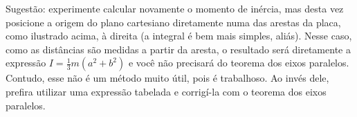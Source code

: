 \begin{question}
\begin{solution}
      Sugestão: experimente calcular novamente o momento de inércia, mas desta vez posicione a origem do plano cartesiano diretamente numa das arestas da placa, como ilustrado acima, à direita (a integral é bem mais simples, aliás).
      Nesse caso, como as distâncias são medidas a partir da aresta, o resultado será diretamente a expressão $I = \frac{1}{3} m (a^2 + b^2)$ e você não precisará do teorema dos eixos paralelos.
      Contudo, esse não é um método muito útil, pois é trabalhoso.
      Ao invés dele, prefira utilizar uma expressão tabelada e corrigí-la com o teorema dos eixos paralelos.
    \end{solution}
\end{question}